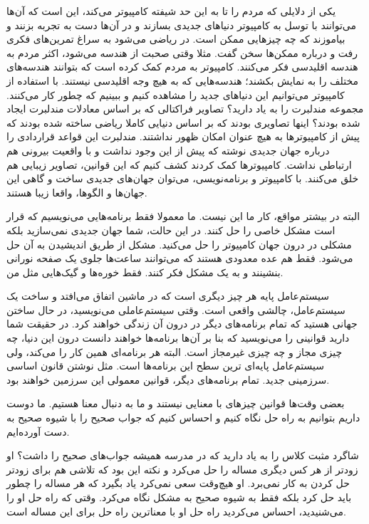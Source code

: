 یکی از دلایلی که مردم را تا به این حد شیفته کامپیوتر می‌کند، این است که
آن‌ها می‌توانند با توسل به کامپیوتر دنیاهای جدیدی بسازند و در آن‌ها دست
به تجربه بزنند و بیاموزند که چه چیزهایی ممکن است. در ریاضی می‌شود به
سراغ تمرین‌های فکری رفت و درباره ممکن‌ها سخن گفت. مثلا وقتی صحبت از
هندسه می‌شود،‌ اکثر مردم به هندسه اقلیدسی فکر می‌کنند. کامپیوتر به مردم
کمک کرده است که بتوانند هندسه‌‌های مختلف را به نمایش بکشند؛ هندسه‌هایی که
به هیچ وجه اقلیدسی نیستند. با استفاده از کامپیوتر می‌توانیم این دنیاهای
جدید را مشاهده کنیم و ببینیم که چطور کار می‌کنند. مجموعه
مندلبرت را به یاد دارید؟ تصاویر فراکتالی که بر
اساس معادلات مندلبرت ایجاد شده بودند؟ اینها تصاویری بودند که بر اساس
دنیایی کاملا ریاضی ساخته شده بودند که پیش از کامپیوترها به هیچ عنوان
امکان ظهور نداشتند. مندلبرت این قواعد قراردادی را درباره جهان جدیدی
نوشته که پیش از این وجود نداشت و با واقعیت بیرونی هم ارتباطی
نداشت. کامپیوترها کمک کردند کشف کنیم که این قوانین، تصاویر زیبایی هم
خلق می‌کنند. با کامپیوتر و برنامه‌نویسی، می‌توان جهان‌های جدیدی ساخت و
گاهی این جهان‌ها و الگوها، واقعا زیبا هستند.

البته در بیشتر مواقع،‌ کار ما این نیست. ما معمولا فقط برنامه‌هایی
می‌نویسیم که قرار است مشکل خاصی را حل کنند. در این حالت، شما جهان جدیدی
نمی‌سازید بلکه مشکلی در درون جهان کامپیوتر را حل می‌کنید. مشکل از طریق
اندیشیدن به آن حل می‌شود. فقط هم عده معدودی هستند که می‌توانند ساعت‌ها
جلوی یک صفحه نورانی بنشینند و به یک مشکل فکر کنند. فقط خوره‌ها و
گیک‌هایی مثل من.

سیستم‌عامل پایه هر چیز دیگری است که در ماشین اتفاق می‌افتد و ساخت یک
سیستم‌عامل، چالشی واقعی است. وقتی سیستم‌عاملی می‌نویسید، در حال ساختن
جهانی هستید که تمام برنامه‌های دیگر در درون آن زندگی خواهند کرد. در
حقیقت شما دارید قوانینی را می‌نویسید که بنا بر آن‌ها برنامه‌ها خواهند
دانست درون این دنیا، چه چیزی مجاز و چه چیزی غیرمجاز است. البته هر
برنامه‌ای همین کار را می‌کند، ولی سیستم‌عامل پایه‌ای ترین سطح این برنامه‌ها
است. مثل نوشتن قانون اساسی سرزمینی جدید. تمام برنامه‌های دیگر، قوانین
معمولی این سرزمین خواهند بود.

بعضی وقت‌ها قوانین چیزهای با معنایی نیستند و ما به دنبال معنا هستیم. ما
دوست داریم بتوانیم به راه حل نگاه کنیم و احساس کنیم که جواب صحیح را با
شیوه صحیح به دست آورده‌ایم.

شاگرد مثبت کلاس را به یاد دارید که در مدرسه همیشه جواب‌های صحیح را
داشت؟ او زودتر از هر کس دیگری مساله را حل می‌کرد و نکته این بود که
تلاشی هم برای زودتر حل کردن به کار نمی‌برد. او هیچ‌وقت سعی نمی‌کرد یاد
بگیرد که هر مساله را چطور باید حل کرد بلکه فقط به شیوه صحیح به مشکل
نگاه می‌کرد. وقتی که راه حل او را می‌شنیدید، احساس می‌کردید راه حل او با
معناترین راه حل برای این مساله است.

